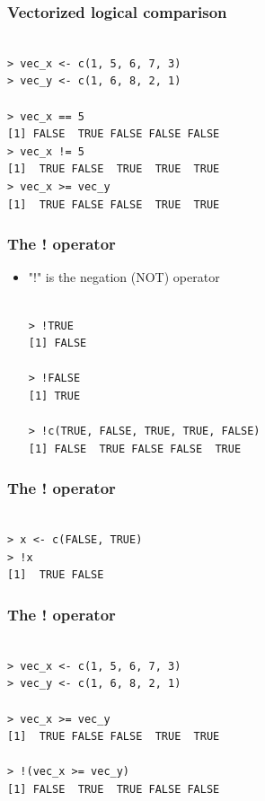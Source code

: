 \documentclass[xcolor=dvipsnames, xcolor=table]{beamer} %
\theoremstyle{mystyle}
\begin{document}
\begin{frame}[fragile] %

\frametitle{Vectorized logical comparison}


\begin{verbatim}

> vec_x <- c(1, 5, 6, 7, 3)
> vec_y <- c(1, 6, 8, 2, 1)

> vec_x == 5
[1] FALSE  TRUE FALSE FALSE FALSE
> vec_x != 5
[1]  TRUE FALSE  TRUE  TRUE  TRUE
> vec_x >= vec_y
[1]  TRUE FALSE FALSE  TRUE  TRUE

\end{verbatim}
\end{frame}

\begin{frame}[fragile] %

\frametitle{The ! operator}

\begin{itemize}
\item "!" is the negation (NOT) operator
\begin{verbatim}

> !TRUE
[1] FALSE

> !FALSE
[1] TRUE

> !c(TRUE, FALSE, TRUE, TRUE, FALSE)
[1] FALSE  TRUE FALSE FALSE  TRUE

\end{verbatim}
\end{itemize}
\end{frame}

\begin{frame}[fragile] %

\frametitle{The ! operator}

\begin{verbatim}

> x <- c(FALSE, TRUE)
> !x
[1]  TRUE FALSE

\end{verbatim}
\end{frame}

\begin{frame}[fragile] %

\frametitle{The ! operator}


\begin{verbatim}

> vec_x <- c(1, 5, 6, 7, 3)
> vec_y <- c(1, 6, 8, 2, 1)

> vec_x >= vec_y
[1]  TRUE FALSE FALSE  TRUE  TRUE

> !(vec_x >= vec_y)
[1] FALSE  TRUE  TRUE FALSE FALSE

\end{verbatim}
\end{frame}
\end{document}
